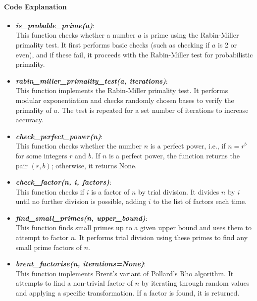 \documentclass[12pt]{report}
\begin{document}
\paragraph{Code Explanation}

\begin{itemize}

    \item \textbf{\textit{is\_probable\_prime(a)}}: \\
    This function checks whether a number $a$ is prime using the Rabin-Miller primality test. It first performs basic checks (such as checking if $a$ is 2 or even), and if these fail, it proceeds with the Rabin-Miller test for probabilistic primality.
    
    \item \textbf{\textit{rabin\_miller\_primality\_test(a, iterations)}}: \\
    This function implements the Rabin-Miller primality test. It performs modular exponentiation and checks randomly chosen bases to verify the primality of $a$. The test is repeated for a set number of iterations to increase accuracy.

    \item \textbf{\textit{check\_perfect\_power(n)}}: \\
    This function checks whether the number $n$ is a perfect power, i.e., if $n = r^b$ for some integers $r$ and $b$. If $n$ is a perfect power, the function returns the pair $(r, b)$; otherwise, it returns None.

    \item \textbf{\textit{check\_factor(n, i, factors)}}:\\ 
    This function checks if $i$ is a factor of $n$ by trial division. It divides $n$ by $i$ until no further division is possible, adding $i$ to the list of factors each time.

    \item \textbf{\textit{find\_small\_primes(n, upper\_bound)}}: \\
    This function finds small primes up to a given upper bound and uses them to attempt to factor $n$. It performs trial division using these primes to find any small prime factors of $n$.

    \item \textbf{\textit{brent\_factorise(n, iterations=None)}}: \\
    This function implements Brent's variant of Pollard’s Rho algorithm. It attempts to find a non-trivial factor of $n$ by iterating through random values and applying a specific transformation. If a factor is found, it is returned.


\end{itemize}
\end{document}
